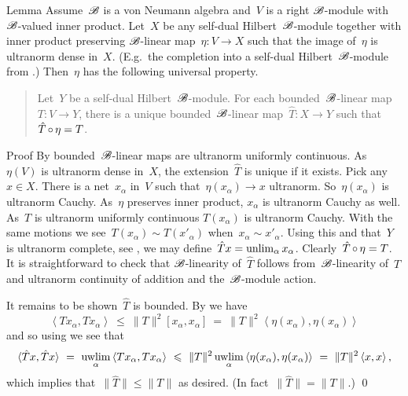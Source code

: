 \documentclass[b]{subfiles}
\begin{document}
\begin{parsec}%
\begin{point}{Lemma}%
Assume~$\mathscr{B}$ is a von Neumann algebra
    and~$V$ is a right $\mathscr{B}$-module
    with~$\mathscr{B}$-valued inner product.
Let~$X$ be any self-dual Hilbert~$\mathscr{B}$-module
    together with inner product preserving
    $\mathscr{B}$-linear map~$\eta\colon V \to X$
    such that the image of~$\eta$ is ultranorm dense in~$X$.
(E.g.~the completion into a self-dual Hilbert~$\mathscr{B}$-module
from .)
Then~$\eta$ has the following universal property.
\begin{quote}
Let~$Y$ be a self-dual Hilbert~$\mathscr{B}$-module.
For each bounded~$\mathscr{B}$-linear
    map~$T\colon V \to Y$,
    there is a unique bounded~$\mathscr{B}$-linear
    map~$\hat{T} \colon X \to Y$
    such that~$\hat{T} \mathop{\circ} \eta = T$.
\end{quote}
\begin{point}{Proof}%
By  bounded~$\mathscr{B}$-linear
    maps are ultranorm uniformly continuous.
As~$\eta(V)$ is ultranorm dense in~$X$,
    the extension~$\hat{T}$ is unique if it exists.
Pick any~$x \in X$.
There is a net~$x_\alpha$ in~$V$ such
    that~$\eta(x_\alpha) \to x$ ultranorm.
So~$\eta(x_\alpha)$ is ultranorm Cauchy.
As~$\eta$ preserves inner product,
    $x_\alpha$ is ultranorm Cauchy as well.
As~$T$ is ultranorm uniformly continuous
    $T(x_\alpha)$ is ultranorm Cauchy.
With the same motions we see~$T(x_\alpha) \sim T(x'_\alpha)$
    when~$x_\alpha \sim x'_\alpha$.
Using this and that~$Y$ is ultranorm complete, see ,
    we may define~$\hat{T} x = \unlim_\alpha x_\alpha$.
Clearly~$\hat{T}\mathop{\circ}\eta=T$.
It is straightforward to check
    that $\mathscr{B}$-linearity
    of~$\hat{T}$
    follows from~$\mathscr{B}$-linearity of~$T$
    and ultranorm continuity of addition and
        the~$\mathscr{B}$-module action.

It remains to be shown~$\hat{T}$ is bounded.
By   we have
\begin{equation*}
\left<T x_\alpha,T x_\alpha\right>
\ \leq\  \| T\|^2 [x_\alpha,x_\alpha]
\ =\  \|T\|^2 \left<\eta(x_\alpha),\eta(x_\alpha)\right>
\end{equation*}
and so using  we see that
\begin{equation*}
\langle\hat{T} x, \hat{T} x\rangle \ =\ 
\uwlim_\alpha \left<T x_\alpha, T x_\alpha\right>
            \ \leq \ \|T\|^2 \uwlim_\alpha \left<\eta(x_\alpha), \eta(x_\alpha)\right>
            \ =\  \|T\|^2 \left<x,x\right>,
\end{equation*}
which implies that~$\|\hat{T}\| \leq \|T\|$ as desired.
(In fact~$\|\hat{T}\| = \|T\|$.) \qed
\end{point}
\end{point}
\end{parsec}
\end{document}
